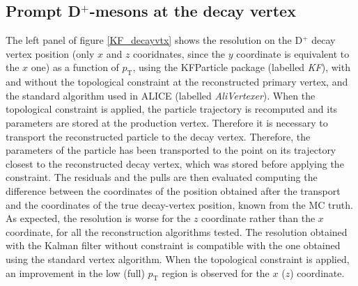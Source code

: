 \documentclass[b5paper,10pt,twoside,oldstyle,classica]{toptesi}
\newcommand{\pt}{p_\text{T}}
\begin{document}
\subsection{Prompt D$^+$-mesons at the decay vertex}
The left panel of figure \ref{KF_decayvtx} shows the resolution on the D$^+$ decay vertex position (only $x$ and $z$ cooridnates, since the $y$ coordinate is equivalent to the $x$ one) as a function of $\pt$, using the KFParticle package (labelled \textit{KF}), with and without the topological constraint at the reconstructed primary vertex, and the standard algorithm used in ALICE (labelled \textit{AliVertexer}). When the topological constraint is applied, the particle trajectory is recomputed and its parameters are stored at the production vertex. Therefore it is necessary to transport the reconstructed particle to the decay vertex. Therefore, the parameters of the particle has been transported to the point on its trajectory closest to the reconstructed decay vertex, which was stored before applying the constraint. The residuals and the pulls are then evaluated computing the difference between the coordinates of the position obtained after the transport and the coordinates of the true decay-vertex position, known from the MC truth. As expected, the resolution is worse for the $z$ coordinate rather than the $x$ coordinate, for all the reconstruction algorithms tested. The resolution obtained with the Kalman filter without constraint is compatible with the one obtained using the standard vertex algorithm. When the topological constraint is applied, an improvement in the low (full) $\pt$ region is observed for the $x$ ($z$) coordinate. 
\end{document}
